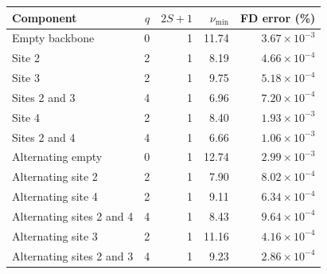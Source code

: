 \begin{tabular}{lrrrr}\toprule
Component & $q$ & $2S+1$ & $\nu_{\min}$ & FD error (\%)\\\midrule
Empty backbone & 0 & 1 & 11.74 & $3.67\times10^{-3}$\\
Site 2 & 2 & 1 & 8.19 & $4.66\times10^{-4}$\\
Site 3 & 2 & 1 & 9.75 & $5.18\times10^{-4}$\\
Sites 2 and 3 & 4 & 1 & 6.96 & $7.20\times10^{-4}$\\
Site 4 & 2 & 1 & 8.40 & $1.93\times10^{-3}$\\
Sites 2 and 4 & 4 & 1 & 6.66 & $1.06\times10^{-3}$\\
Alternating empty & 0 & 1 & 12.74 & $2.99\times10^{-3}$\\
Alternating site 2 & 2 & 1 & 7.90 & $8.02\times10^{-4}$\\
Alternating site 4 & 2 & 1 & 9.11 & $6.34\times10^{-4}$\\
Alternating sites 2 and 4 & 4 & 1 & 8.43 & $9.64\times10^{-4}$\\
Alternating site 3 & 2 & 1 & 11.16 & $4.16\times10^{-4}$\\
Alternating sites 2 and 3 & 4 & 1 & 9.23 & $2.86\times10^{-4}$\\
\bottomrule\end{tabular}
